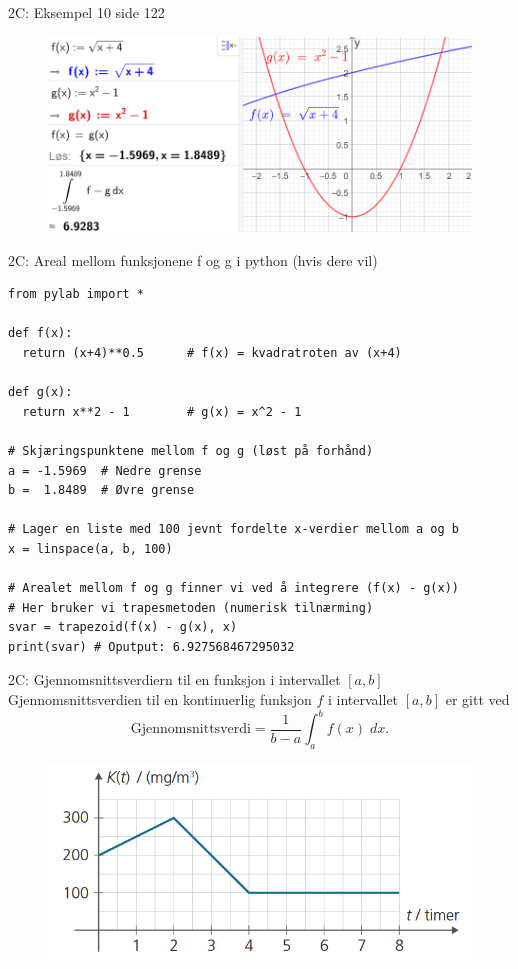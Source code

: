 \greenheader\begin{frame}{2C: Eksempel 10 side 122}
\begin{figure}
    \centering
    \includegraphics[width=\linewidth]{R2-K2C-7.png}
\end{figure}
\end{frame}

\greenheader
\begin{frame}[fragile]{2C: Areal mellom funksjonene f og g i python (hvis dere vil)}
\begin{verbatim}
from pylab import *

def f(x):
  return (x+4)**0.5      # f(x) = kvadratroten av (x+4)

def g(x):
  return x**2 - 1        # g(x) = x^2 - 1

# Skjæringspunktene mellom f og g (løst på forhånd)
a = -1.5969  # Nedre grense
b =  1.8489  # Øvre grense

# Lager en liste med 100 jevnt fordelte x-verdier mellom a og b
x = linspace(a, b, 100)

# Arealet mellom f og g finner vi ved å integrere (f(x) - g(x))
# Her bruker vi trapesmetoden (numerisk tilnærming)
svar = trapezoid(f(x) - g(x), x)
print(svar) # Oputput: 6.927568467295032
\end{verbatim}
\end{frame}





\redheader
\begin{frame}{2C: Gjennomsnittsverdiern til en funksjon i intervallet $[a, b]$}
Gjennomsnittsverdien til en kontinuerlig funksjon \(f\) i intervallet \([a,b]\) er gitt ved
\[\text{Gjennomsnittsverdi} = \frac{1}{b-a}\int_a^b f(x) \; dx.\]
\begin{figure}
    \centering
    \includegraphics[width=0.6\linewidth]{R2-K2B-13.png}
\end{figure}    
\end{frame}

